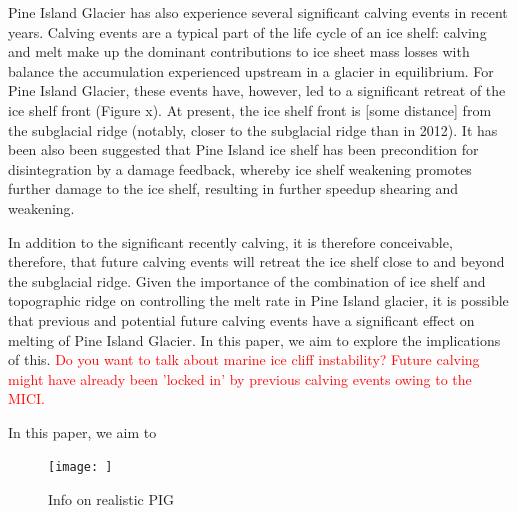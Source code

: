 \documentclass[draft]{agujournal2019}
\newcommand{\red}[1]{\textcolor{red}{#1}}
\begin{document}
Pine Island Glacier has also experience several significant calving events in recent years. Calving events are a typical part of the life cycle of an ice shelf: calving and melt make up the dominant contributions to ice sheet mass losses with balance the accumulation experienced upstream in a glacier in equilibrium. For Pine Island Glacier, these events have, however, led to a significant retreat of the ice shelf front (Figure x). At present, the ice shelf front is [some distance] from the subglacial ridge (notably, closer to the subglacial ridge than in 2012). It has been also been suggested that Pine Island ice shelf has been precondition for disintegration by a damage feedback, whereby ice shelf weakening promotes further damage to the ice shelf, resulting in further speedup shearing and weakening. 

In addition to the significant recently calving, it is therefore conceivable, therefore, that future calving events will retreat the ice shelf close to and beyond the subglacial ridge. Given the importance of the combination of ice shelf and topographic ridge on controlling the melt rate in Pine Island glacier, it is possible that previous and potential future calving events have a significant effect on melting of Pine Island Glacier. In this paper, we aim to explore the implications of this.
\red{Do you want to talk about marine ice cliff instability? Future calving might have already been 'locked in' by previous calving events owing to the MICI.}

In this paper, we aim to 



\begin{figure}
    \centering
    \texttt{[image: ]}
    \caption{Info on realistic PIG}
    \label{fig:figure1}
\end{figure}
\end{document}
